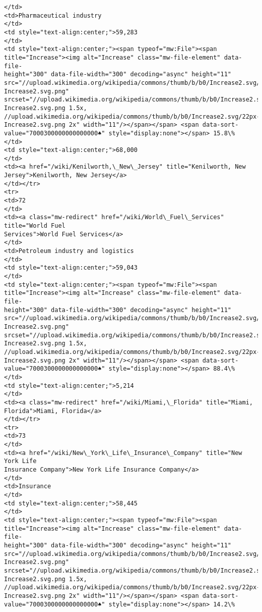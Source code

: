 \documentclass[11pt]{article}
\begin{document}
\begin{Verbatim}[commandchars=\\\{\}]
</td>
<td>Pharmaceutical industry
</td>
<td style="text-align:center;">59,283
</td>
<td style="text-align:center;"><span typeof="mw:File"><span
title="Increase"><img alt="Increase" class="mw-file-element" data-file-
height="300" data-file-width="300" decoding="async" height="11"
src="//upload.wikimedia.org/wikipedia/commons/thumb/b/b0/Increase2.svg/11px-
Increase2.svg.png"
srcset="//upload.wikimedia.org/wikipedia/commons/thumb/b/b0/Increase2.svg/17px-
Increase2.svg.png 1.5x,
//upload.wikimedia.org/wikipedia/commons/thumb/b/b0/Increase2.svg/22px-
Increase2.svg.png 2x" width="11"/></span></span> <span data-sort-
value="7000300000000000000♠" style="display:none"></span> 15.8\%
</td>
<td style="text-align:center;">68,000
</td>
<td><a href="/wiki/Kenilworth,\_New\_Jersey" title="Kenilworth, New
Jersey">Kenilworth, New Jersey</a>
</td></tr>
<tr>
<td>72
</td>
<td><a class="mw-redirect" href="/wiki/World\_Fuel\_Services" title="World Fuel
Services">World Fuel Services</a>
</td>
<td>Petroleum industry and logistics
</td>
<td style="text-align:center;">59,043
</td>
<td style="text-align:center;"><span typeof="mw:File"><span
title="Increase"><img alt="Increase" class="mw-file-element" data-file-
height="300" data-file-width="300" decoding="async" height="11"
src="//upload.wikimedia.org/wikipedia/commons/thumb/b/b0/Increase2.svg/11px-
Increase2.svg.png"
srcset="//upload.wikimedia.org/wikipedia/commons/thumb/b/b0/Increase2.svg/17px-
Increase2.svg.png 1.5x,
//upload.wikimedia.org/wikipedia/commons/thumb/b/b0/Increase2.svg/22px-
Increase2.svg.png 2x" width="11"/></span></span> <span data-sort-
value="7000300000000000000♠" style="display:none"></span> 88.4\%
</td>
<td style="text-align:center;">5,214
</td>
<td><a class="mw-redirect" href="/wiki/Miami,\_Florida" title="Miami,
Florida">Miami, Florida</a>
</td></tr>
<tr>
<td>73
</td>
<td><a href="/wiki/New\_York\_Life\_Insurance\_Company" title="New York Life
Insurance Company">New York Life Insurance Company</a>
</td>
<td>Insurance
</td>
<td style="text-align:center;">58,445
</td>
<td style="text-align:center;"><span typeof="mw:File"><span
title="Increase"><img alt="Increase" class="mw-file-element" data-file-
height="300" data-file-width="300" decoding="async" height="11"
src="//upload.wikimedia.org/wikipedia/commons/thumb/b/b0/Increase2.svg/11px-
Increase2.svg.png"
srcset="//upload.wikimedia.org/wikipedia/commons/thumb/b/b0/Increase2.svg/17px-
Increase2.svg.png 1.5x,
//upload.wikimedia.org/wikipedia/commons/thumb/b/b0/Increase2.svg/22px-
Increase2.svg.png 2x" width="11"/></span></span> <span data-sort-
value="7000300000000000000♠" style="display:none"></span> 14.2\%

\end{Verbatim}
\end{document}
